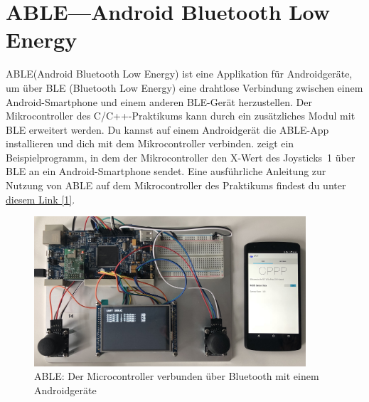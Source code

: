 \clearpage
\section{\ExercisePrefixEmbeddedC ABLE---Android Bluetooth Low Energy \optional}
\newcommand{\toolAble}{\textsc{ABLE}\xspace}
\toolAble (Android Bluetooth Low Energy) ist eine Applikation für Androidgeräte, um über BLE (Bluetooth Low Energy) eine drahtlose Verbindung zwischen einem Android-Smartphone und einem anderen BLE-Gerät herzustellen.
Der Mikrocontroller des C/C++-Praktikums kann durch ein zusätzliches Modul mit BLE erweitert werden.
Du kannst auf einem Androidgerät die \toolAble-App installieren und dich mit dem Mikrocontroller verbinden.
 zeigt ein Beispielprogramm, in dem der Mikrocontroller den X-Wert des Joysticks~1 über BLE an ein Android-Smartphone sendet.
Eine ausführliche Anleitung zur Nutzung von \toolAble auf dem Mikrocontroller des Praktikums findest du unter \href{https://github.com/Echtzeitsysteme/able/wiki/Cpp-Lab-Tutorial}{diesem Link [1]}. 
\begin{figure}[!htb]
	\centering
	\includegraphics[width=0.9\textwidth]{./05_c/figures/ABLE_preview.jpg}
	\caption{\toolAble: Der Microcontroller verbunden über Bluetooth mit einem Androidgeräte}
	\label{fig:ablePreview}
\end{figure} 
